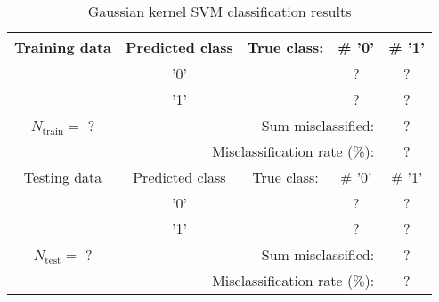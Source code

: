 \documentclass[a4paper,11pt]{article}
\begin{document}
\begin{table}[H]
\caption{Gaussian kernel SVM classification results}
\centering
\begin{tabular}{c | c | c c c}
\hline\hline
Training data & Predicted class & True class: & \# '0' & \# '1' \\ [0.5ex] %
\hline
& '0' & & ? & ? \\
& '1' & & ? & ?\\ 
\hline 
$N_\text{train} = $ ?  & \multicolumn{3}{r}{Sum misclassified: } & ? \\ [.5ex]
\hline 
 & \multicolumn{3}{r}{Misclassification rate (\%):} & ? \\ [.5ex]
\hline\hline
%
Testing data & Predicted class & True class: & \# '0' & \# '1' \\ [0.5ex] %
\hline
& '0' & & ? & ? \\
& '1' & & ? & ?\\ 
\hline 
$N_\text{test} = $ ?  & \multicolumn{3}{r}{Sum misclassified:} & ?  \\ [.5ex]
\hline 
 & \multicolumn{3}{r}{Misclassification rate (\%): } &? \\ [.5ex]
\hline\hline
%
\end{tabular}
\label{table:kernelsvmtable}
\end{table}
%
\end{document}
